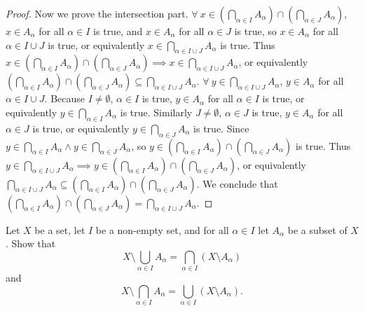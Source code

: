 \begin{proof}
Now we prove the intersection part.
\(\forall\ x \in (\bigcap_{\alpha \in I} A_{\alpha}) \cap (\bigcap_{\alpha \in J} A_{\alpha})\), \(x \in A_{\alpha}\) for all \(\alpha \in I\) is true, and \(x \in A_{\alpha}\) for all \(\alpha \in J\) is true, so \(x \in A_{\alpha}\) for all \(\alpha \in I \cup J\) is true, or equivalently \(x \in \bigcap_{\alpha \in I \cup J} A_{\alpha}\) is true.
Thus \(x \in (\bigcap_{\alpha \in I} A_{\alpha}) \cap (\bigcap_{\alpha \in J} A_{\alpha}) \implies x \in \bigcap_{\alpha \in I \cup J} A_{\alpha}\), or equivalently \((\bigcap_{\alpha \in I} A_{\alpha}) \cap (\bigcap_{\alpha \in J} A_{\alpha}) \subseteq \bigcap_{\alpha \in I \cup J} A_{\alpha}\).
\(\forall\ y \in \bigcap_{\alpha \in I \cup J} A_{\alpha}\), \(y \in A_{\alpha}\) for all \(\alpha \in I \cup J\).
Because \(I \neq \emptyset\), \(\alpha \in I\) is true, \(y \in A_{\alpha}\) for all \(\alpha \in I\) is true, or equivalently \(y \in \bigcap_{\alpha \in I} A_{\alpha}\) is true.
Similarly \(J \neq \emptyset\), \(\alpha \in J\) is true, \(y \in A_{\alpha}\) for all \(\alpha \in J\) is true, or equivalently \(y \in \bigcap_{\alpha \in J} A_{\alpha}\) is true.
Since \(y \in \bigcap_{\alpha \in I} A_{\alpha} \land y \in \bigcap_{\alpha \in J} A_{\alpha}\), so \(y \in (\bigcap_{\alpha \in I} A_{\alpha}) \cap (\bigcap_{\alpha \in J} A_{\alpha})\) is true.
Thus \(y \in \bigcap_{\alpha \in I \cup J} A_{\alpha} \implies y \in (\bigcap_{\alpha \in I} A_{\alpha}) \cap (\bigcap_{\alpha \in J} A_{\alpha})\), or equivalently \(\bigcap_{\alpha \in I \cup J} A_{\alpha} \subseteq (\bigcap_{\alpha \in I} A_{\alpha}) \cap (\bigcap_{\alpha \in J} A_{\alpha})\).
We conclude that \((\bigcap_{\alpha \in I} A_{\alpha}) \cap (\bigcap_{\alpha \in J} A_{\alpha}) = \bigcap_{\alpha \in I \cup J} A_{\alpha}\).
\end{proof}

\begin{exercise}\label{exercise 3.4.11}
Let \(X\) be a set, let \(I\) be a non-empty set, and for all \(\alpha \in I\) let \(A_{\alpha}\) be a subset of \(X\).
Show that
\[
    X \setminus \bigcup_{\alpha \in I} A_{\alpha} = \bigcap_{\alpha \in I} (X \setminus A_{\alpha})
\]
and
\[
    X \setminus \bigcap_{\alpha \in I} A_{\alpha} = \bigcup_{\alpha \in I} (X \setminus A_{\alpha}).
\]
\end{exercise}

